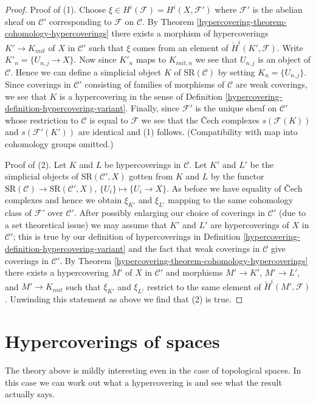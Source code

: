 \begin{proof}
\medskip\noindent
Proof of (1). Choose $\xi \in H^i(\mathcal{F}) = H^i(X, \mathcal{F}')$
where $\mathcal{F}'$ is the abelian sheaf on $\mathcal{C}'$ corresponding
to $\mathcal{F}$ on $\mathcal{C}$. By
Theorem \ref{hypercovering-theorem-cohomology-hypercoverings}
there exists a morphism of hypercoverings $K' \to K_{init}$
of $X$ in $\mathcal{C}'$ such that $\xi$ comes from an element
of $\check{H}^i(K', \mathcal{F})$.
Write $K'_n = \{U_{n, j} \to X\}$. Now since $K'_n$ maps to
$K_{init, n}$ we see that $U_{n, j}$ is an object of $\mathcal{C}$.
Hence we can define a simplicial object $K$ of $\text{SR}(\mathcal{C})$
by setting $K_n = \{U_{n, j}\}$. Since coverings in
$\mathcal{C}'$ consisting of families of morphisms of $\mathcal{C}$
are weak coverings, we see that $K$ is a hypercovering in the sense
of Definition \ref{hypercovering-definition-hypercovering-variant}.
Finally, since $\mathcal{F}'$ is the unique sheaf on $\mathcal{C}'$
whose restriction to $\mathcal{C}$ is equal to $\mathcal{F}$
we see that the {\v C}ech complexes $s(\mathcal{F}(K))$
and $s(\mathcal{F}'(K'))$ are identical and (1) follows.
(Compatibility with map into cohomology groups omitted.)

\medskip\noindent
Proof of (2). Let $K$ and $L$ be hypercoverings in $\mathcal{C}$.
Let $K'$ and $L'$ be the simplicial objects of $\text{SR}(\mathcal{C}', X)$
gotten from $K$ and $L$ by the functor
$\text{SR}(\mathcal{C}) \to \text{SR}(\mathcal{C}', X)$,
$\{U_i\} \mapsto \{U_i \to X\}$. As before we have equality of
{\v C}ech complexes and hence we obtain $\xi_{K'}$ and
$\xi_{L'}$ mapping to the same cohomology class of $\mathcal{F}'$
over $\mathcal{C}'$. After possibly enlarging our choice
of coverings in $\mathcal{C}'$ (due to a set theoretical issue)
we may assume that $K'$ and $L'$ are hypercoverings of $X$ in
$\mathcal{C}'$; this is true by our definition of hypercoverings in
Definition \ref{hypercovering-definition-hypercovering-variant} and
the fact that weak coverings in $\mathcal{C}$ give coverings in
$\mathcal{C}'$. By
Theorem \ref{hypercovering-theorem-cohomology-hypercoverings}
there exists a hypercovering $M'$ of $X$ in $\mathcal{C}'$
and morphisms $M' \to K'$, $M' \to L'$, and $M' \to K_{init}$
such that $\xi_{K'}$ and $\xi_{L'}$ restrict to the same element of
$\check{H}^i(M', \mathcal{F})$. Unwinding this statement as above
we find that (2) is true.
\end{proof}

\section{Hypercoverings of spaces}
\label{hypercovering-section-hypercoverings-spaces}
The theory above is mildly interesting even in the case of topological
spaces. In this case we can work out what a hypercovering is and see
what the result actually says.

